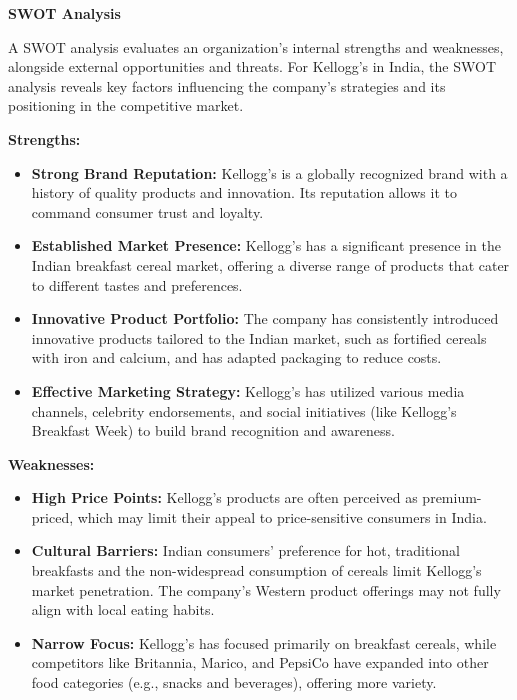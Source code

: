 \documentclass[10pt,a4paper]{book}
\begin{document}
\vspace{1cm} 

\begin{center}
\textbf{SWOT Analysis}
\end{center} 

A SWOT analysis evaluates an organization’s internal strengths and weaknesses, alongside external opportunities and threats. For Kellogg's in India, the SWOT analysis reveals key factors influencing the company’s strategies and its positioning in the competitive market.

\vspace{0.5cm}

\textbf{Strengths:}
\begin{itemize}
    \item \textbf{Strong Brand Reputation:} Kellogg’s is a globally recognized brand with a history of quality products and innovation. Its reputation allows it to command consumer trust and loyalty.
    \item \textbf{Established Market Presence:} Kellogg’s has a significant presence in the Indian breakfast cereal market, offering a diverse range of products that cater to different tastes and preferences.
    \item \textbf{Innovative Product Portfolio:} The company has consistently introduced innovative products tailored to the Indian market, such as fortified cereals with iron and calcium, and has adapted packaging to reduce costs.
    \item \textbf{Effective Marketing Strategy:} Kellogg’s has utilized various media channels, celebrity endorsements, and social initiatives (like Kellogg’s Breakfast Week) to build brand recognition and awareness.
\end{itemize}

\vspace{0.5cm}

\textbf{Weaknesses:}
\begin{itemize}
    \item \textbf{High Price Points:} Kellogg’s products are often perceived as premium-priced, which may limit their appeal to price-sensitive consumers in India.
    \item \textbf{Cultural Barriers:} Indian consumers’ preference for hot, traditional breakfasts and the non-widespread consumption of cereals limit Kellogg’s market penetration. The company’s Western product offerings may not fully align with local eating habits.
    \item \textbf{Narrow Focus:} Kellogg’s has focused primarily on breakfast cereals, while competitors like Britannia, Marico, and PepsiCo have expanded into other food categories (e.g., snacks and beverages), offering more variety.
\end{itemize}
\end{document}
